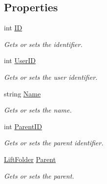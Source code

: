 \subsection*{Properties}
\begin{DoxyCompactItemize}
\item 
int \mbox{\hyperlink{class_bar_none_1_1_shared_1_1_domain_model_1_1_lift_a41955f2368448b1521c3f30eccea8b35}{ID}}
\begin{DoxyCompactList}\small\item\em Gets or sets the identifier. \end{DoxyCompactList}\item 
int \mbox{\hyperlink{class_bar_none_1_1_shared_1_1_domain_model_1_1_lift_a2d4ce30fdc8f3106e81157cb94bed01e}{User\+ID}}
\begin{DoxyCompactList}\small\item\em Gets or sets the user identifier. \end{DoxyCompactList}\item 
string \mbox{\hyperlink{class_bar_none_1_1_shared_1_1_domain_model_1_1_lift_a8e4c0de6b40ac46ac936e5b426d9495e}{Name}}
\begin{DoxyCompactList}\small\item\em Gets or sets the name. \end{DoxyCompactList}\item 
int \mbox{\hyperlink{class_bar_none_1_1_shared_1_1_domain_model_1_1_lift_a64a32b1fc56c45be726b826d03af0c7f}{Parent\+ID}}
\begin{DoxyCompactList}\small\item\em Gets or sets the parent identifier. \end{DoxyCompactList}\item 
\mbox{\hyperlink{class_bar_none_1_1_shared_1_1_domain_model_1_1_lift_folder}{Lift\+Folder}} \mbox{\hyperlink{class_bar_none_1_1_shared_1_1_domain_model_1_1_lift_af1b937ccd64c9dc9bf4d7fe8f6be5235}{Parent}}
\begin{DoxyCompactList}\small\item\em Gets or sets the parent. \end{DoxyCompactList}\item 

\end{DoxyCompactItemize}
